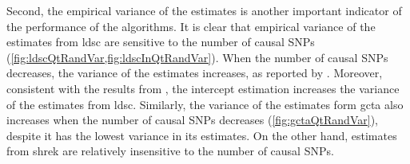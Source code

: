 \documentclass[12pt]{scrbook}
\begin{document}
Second, the empirical variance of the estimates is another important indicator of the performance of the algorithms.
It is clear that empirical variance of the estimates from \gls{ldsc} are sensitive to the number of  causal \glspl{SNP} (\cref{fig:ldscQtRandVar,fig:ldscInQtRandVar}).
When the number of causal \glspl{SNP} decreases, the variance of the estimates increases, as reported by \citet{Bulik-Sullivan2015}.
Moreover, consistent with the results from \citet{Bulik-Sullivan2015}, the intercept estimation increases the variance of the estimates from \gls{ldsc}.
Similarly, the variance of the estimates form \gls{gcta} also increases when the number of causal \glspl{SNP} decreases (\cref{fig:gctaQtRandVar}), despite it has the lowest variance in its estimates.
On the other hand, estimates from \gls{shrek} are relatively insensitive to the number of causal \glspl{SNP}.
\end{document}
